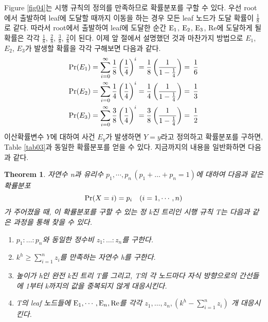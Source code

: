 \documentclass[11pt]{article}
\newtheorem*{theorem}{Theorem}
\begin{document}
Figure \ref{fig04}는 시행 규칙의 정의를 만족하므로 확률분포를 구할 수 있다. 우선 root에서 출발하여 leaf에 도달할 때까지 이동을 하는 경우 모든 leaf 노드가 도달 확률이 $\frac{1}{8}$로 같다. 따라서 root에서 출발하여 leaf에 도달한 순간 $\textnormal{E}_{1}$, $\textnormal{E}_{2}$, $\textnormal{E}_{3}$, Re에 도달하게 될 확률은 각각 $\frac{1}{8}$, $\frac{2}{8}$, $\frac{3}{8}$, $\frac{2}{8}$이 된다. 이제 앞 절에서 설명했던 것과 마찬가지 방법으로 $E_{1}$, $E_{2}$, $E_{3}$가 발생할 확률을 각각 구해보면 다음과 같다.
\[
\begin{split}
\textnormal{Pr}(E_{1}) & = \sum_{i=0}^{\infty} \frac{1}{8}\left(\frac{1}{4}\right)^i = \frac{1}{8}\left(\frac{1}{1 - \frac{1}{4}}\right) = \,\frac{1}{6}\\
\textnormal{Pr}(E_{2}) & = \sum_{i=0}^{\infty} \frac{1}{4}\left(\frac{1}{4}\right)^i = \frac{1}{4}\left(\frac{1}{1 - \frac{1}{4}}\right) = \,\frac{1}{3}\\
\textnormal{Pr}(E_{3}) & = \sum_{i=0}^{\infty} \frac{3}{8}\left(\frac{1}{4}\right)^i = \frac{3}{8}\left(\frac{1}{1 - \frac{1}{4}}\right) = \,\frac{1}{2}
\end{split}
\]
이산확률변수 $Y$에 대하여 사건 $E_{y}$가 발생하면 $Y=y$라고 정의하고 확률분포를 구하면, Table \ref{tab03}과 동일한 확률분포를 얻을 수 있다. 지금까지의 내용을 일반화하면 다음과 같다.\\

\singlespacing
\begin{theorem}
자연수 n과 유리수 $p_{1}, \cdots, p_{n}\,(p_{1}+\dots+p_{n}=1)$에 대하여 다음과 같은 확률분포
\[\textnormal{Pr}(X = i) = p_{i} \quad(i = 1,\cdots, n)\]
가 주어졌을 때, 이 확률분포를 구할 수 있는 정 k진 트리인 시행 규칙 T는 다음과 같은 과정을 통해 찾을 수 있다.
\begin{enumerate}
    \item $p_{1}:\dots:p_{n}$와 동일한 정수비 $z_{1}:\dots:z_{n}$를 구한다.
    \item $k^{h} \ge \displaystyle \sum_{i=1}^{n} z_{i}$를 만족하는 자연수 h를 구한다.
    \item 높이가 h인 완전 k진 트리 T를 그리고, T의 각 노드마다 자식 방향으로의 간선들에 1부터 k까지의 값을 중복되지 않게 대응시킨다.
    \item T의 leaf 노드들에 $\textnormal{E}_1,\cdots,\textnormal{E}_n,\textnormal{Re}$를 각각 $z_{1},\dots,z_{n},\left(k^{h}-\displaystyle \sum_{i=1}^{n}z_{i}\right)$ 개 대응시킨다.
\end{enumerate}
\end{theorem}
\end{document}
